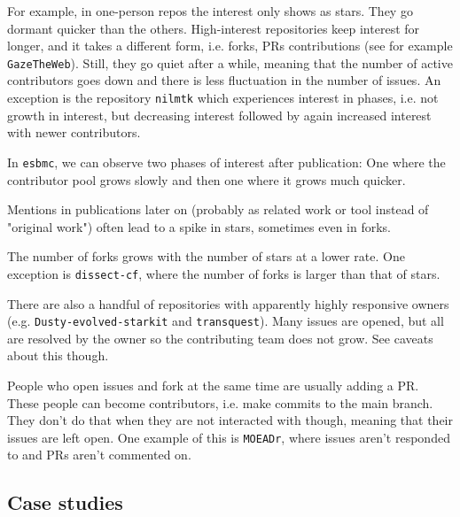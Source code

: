 \documentclass[10pt,a4paper]{scrartcl}
\begin{document}
For example, in one-person repos the interest only shows as stars. They go dormant quicker than the others.
High-interest repositories keep interest for longer, and it takes a different form, i.e. forks, PRs contributions (see for example \verb|GazeTheWeb|). 
Still, they go quiet after a while, meaning that the number of active contributors goes down and there is less fluctuation in the number of issues. 
An exception is the repository \verb|nilmtk| which experiences interest in phases, i.e. not growth in interest, but decreasing interest followed by again increased interest with newer contributors.

In \verb|esbmc|, we can observe two phases of interest after publication: One where the contributor pool grows slowly and then one where it grows much quicker.

Mentions in publications later on (probably as related work or tool instead of "original work") often lead to a spike in stars, sometimes even in forks.

The number of forks grows with the number of stars at a lower rate.
One exception is \verb|dissect-cf|, where the number of forks is larger than that of stars.

There are also a handful of repositories with apparently highly responsive owners (e.g. \verb|Dusty-evolved-starkit| and \verb|transquest|).
Many issues are opened, but all are resolved by the owner so the contributing team does not grow.
See caveats about this though.

People who open issues and fork at the same time are usually adding a PR. These people can become contributors, i.e. make commits to the main branch.
They don't do that when they are not interacted with though, meaning that their issues are left open.
One example of this is \verb|MOEADr|, where issues aren't responded to and PRs aren't commented on.

\subsection*{Case studies}
\end{document}
